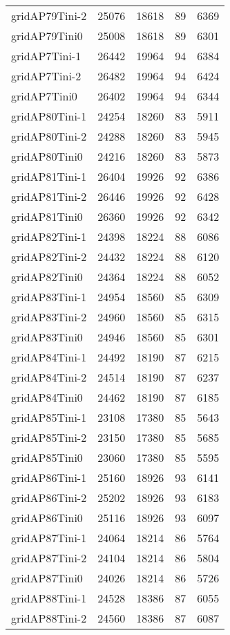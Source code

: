 \begin{longtable}{lrrrr}
gridAP79Tini-2 & 25076 & 18618 & 89 & 6369 \\
gridAP79Tini0 & 25008 & 18618 & 89 & 6301 \\
gridAP7Tini-1 & 26442 & 19964 & 94 & 6384 \\
gridAP7Tini-2 & 26482 & 19964 & 94 & 6424 \\
gridAP7Tini0 & 26402 & 19964 & 94 & 6344 \\
gridAP80Tini-1 & 24254 & 18260 & 83 & 5911 \\
gridAP80Tini-2 & 24288 & 18260 & 83 & 5945 \\
gridAP80Tini0 & 24216 & 18260 & 83 & 5873 \\
gridAP81Tini-1 & 26404 & 19926 & 92 & 6386 \\
gridAP81Tini-2 & 26446 & 19926 & 92 & 6428 \\
gridAP81Tini0 & 26360 & 19926 & 92 & 6342 \\
gridAP82Tini-1 & 24398 & 18224 & 88 & 6086 \\
gridAP82Tini-2 & 24432 & 18224 & 88 & 6120 \\
gridAP82Tini0 & 24364 & 18224 & 88 & 6052 \\
gridAP83Tini-1 & 24954 & 18560 & 85 & 6309 \\
gridAP83Tini-2 & 24960 & 18560 & 85 & 6315 \\
gridAP83Tini0 & 24946 & 18560 & 85 & 6301 \\
gridAP84Tini-1 & 24492 & 18190 & 87 & 6215 \\
gridAP84Tini-2 & 24514 & 18190 & 87 & 6237 \\
gridAP84Tini0 & 24462 & 18190 & 87 & 6185 \\
gridAP85Tini-1 & 23108 & 17380 & 85 & 5643 \\
gridAP85Tini-2 & 23150 & 17380 & 85 & 5685 \\
gridAP85Tini0 & 23060 & 17380 & 85 & 5595 \\
gridAP86Tini-1 & 25160 & 18926 & 93 & 6141 \\
gridAP86Tini-2 & 25202 & 18926 & 93 & 6183 \\
gridAP86Tini0 & 25116 & 18926 & 93 & 6097 \\
gridAP87Tini-1 & 24064 & 18214 & 86 & 5764 \\
gridAP87Tini-2 & 24104 & 18214 & 86 & 5804 \\
gridAP87Tini0 & 24026 & 18214 & 86 & 5726 \\
gridAP88Tini-1 & 24528 & 18386 & 87 & 6055 \\
gridAP88Tini-2 & 24560 & 18386 & 87 & 6087 \\

\end{longtable}
